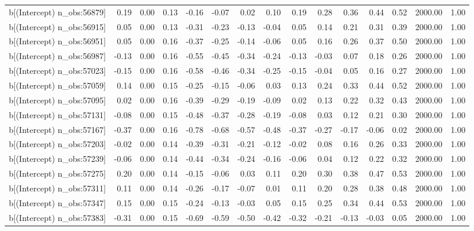 \begin{table}[ht]
\begin{tabular}{rrrrrrrrrrrrrrr}
  b[(Intercept) n\_obs:56879] & 0.19 & 0.00 & 0.13 & -0.16 & -0.07 & 0.02 & 0.10 & 0.19 & 0.28 & 0.36 & 0.44 & 0.52 & 2000.00 & 1.00 \\ 
  b[(Intercept) n\_obs:56915] & 0.05 & 0.00 & 0.13 & -0.31 & -0.23 & -0.13 & -0.04 & 0.05 & 0.14 & 0.21 & 0.31 & 0.39 & 2000.00 & 1.00 \\ 
  b[(Intercept) n\_obs:56951] & 0.05 & 0.00 & 0.16 & -0.37 & -0.25 & -0.14 & -0.06 & 0.05 & 0.16 & 0.26 & 0.37 & 0.50 & 2000.00 & 1.00 \\ 
  b[(Intercept) n\_obs:56987] & -0.13 & 0.00 & 0.16 & -0.55 & -0.45 & -0.34 & -0.24 & -0.13 & -0.03 & 0.07 & 0.18 & 0.26 & 2000.00 & 1.00 \\ 
  b[(Intercept) n\_obs:57023] & -0.15 & 0.00 & 0.16 & -0.58 & -0.46 & -0.34 & -0.25 & -0.15 & -0.04 & 0.05 & 0.16 & 0.27 & 2000.00 & 1.00 \\ 
  b[(Intercept) n\_obs:57059] & 0.14 & 0.00 & 0.15 & -0.25 & -0.15 & -0.06 & 0.03 & 0.13 & 0.24 & 0.33 & 0.44 & 0.52 & 2000.00 & 1.00 \\ 
  b[(Intercept) n\_obs:57095] & 0.02 & 0.00 & 0.16 & -0.39 & -0.29 & -0.19 & -0.09 & 0.02 & 0.13 & 0.22 & 0.32 & 0.43 & 2000.00 & 1.00 \\ 
  b[(Intercept) n\_obs:57131] & -0.08 & 0.00 & 0.15 & -0.48 & -0.37 & -0.28 & -0.19 & -0.08 & 0.03 & 0.12 & 0.21 & 0.30 & 2000.00 & 1.00 \\ 
  b[(Intercept) n\_obs:57167] & -0.37 & 0.00 & 0.16 & -0.78 & -0.68 & -0.57 & -0.48 & -0.37 & -0.27 & -0.17 & -0.06 & 0.02 & 2000.00 & 1.00 \\ 
  b[(Intercept) n\_obs:57203] & -0.02 & 0.00 & 0.14 & -0.39 & -0.31 & -0.21 & -0.12 & -0.02 & 0.08 & 0.16 & 0.26 & 0.33 & 2000.00 & 1.00 \\ 
  b[(Intercept) n\_obs:57239] & -0.06 & 0.00 & 0.14 & -0.44 & -0.34 & -0.24 & -0.16 & -0.06 & 0.04 & 0.12 & 0.22 & 0.32 & 2000.00 & 1.00 \\ 
  b[(Intercept) n\_obs:57275] & 0.20 & 0.00 & 0.14 & -0.15 & -0.06 & 0.03 & 0.11 & 0.20 & 0.30 & 0.38 & 0.47 & 0.53 & 2000.00 & 1.00 \\ 
  b[(Intercept) n\_obs:57311] & 0.11 & 0.00 & 0.14 & -0.26 & -0.17 & -0.07 & 0.01 & 0.11 & 0.20 & 0.28 & 0.38 & 0.48 & 2000.00 & 1.00 \\ 
  b[(Intercept) n\_obs:57347] & 0.15 & 0.00 & 0.15 & -0.24 & -0.13 & -0.03 & 0.05 & 0.15 & 0.25 & 0.34 & 0.44 & 0.53 & 2000.00 & 1.00 \\ 
  b[(Intercept) n\_obs:57383] & -0.31 & 0.00 & 0.15 & -0.69 & -0.59 & -0.50 & -0.42 & -0.32 & -0.21 & -0.13 & -0.03 & 0.05 & 2000.00 & 1.00 \\ 

\end{tabular}
\end{table}
